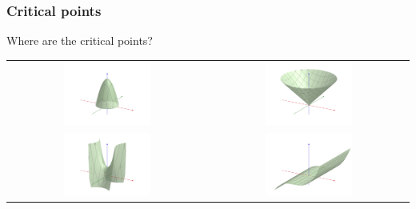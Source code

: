 \documentclass[10pt]{beamer}
\begin{document}
\begin{frame}
\frametitle{Critical points}
Where are the critical points?
\begin{tabular}{cc}
\includegraphics[width=0.45\textwidth]{max.png}&\includegraphics[width=0.45\textwidth]{cone.png}\\
\includegraphics[width=0.45\textwidth]{saddle.png}&\includegraphics[width=0.45\textwidth]{fail3.png}
\end{tabular}
\end{frame}
\end{document}

